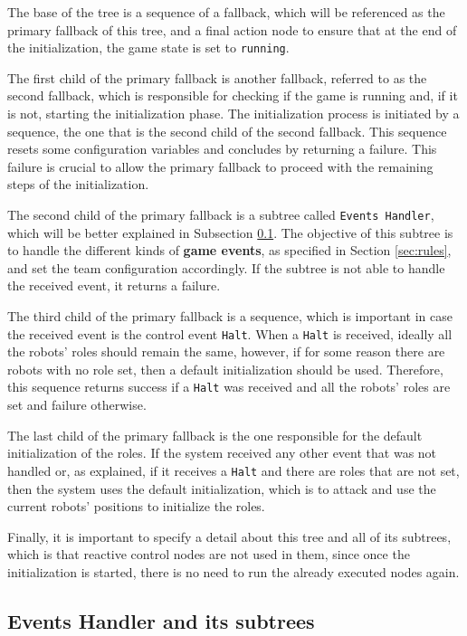 The base of the tree is a sequence of a fallback, which will be referenced as the primary fallback of this tree, and a final action node to ensure that at the end of the initialization, the game state is set to \texttt{running}. 

The first child of the primary fallback is another fallback, referred to as the second fallback, which is responsible for checking if the game is running and, if it is not, starting the initialization phase. The initialization process is initiated by a sequence, the one that is the second child of the second fallback. This sequence resets some configuration variables and concludes by returning a failure. This failure is crucial to allow the primary fallback to proceed with the remaining steps of the initialization.

The second child of the primary fallback is a subtree called \texttt{Events Handler}, which will be better explained in Subsection \ref{subsec:events_handler_spec}. The objective of this subtree is to handle the different kinds of \textbf{game events}, as specified in Section \ref{sec:rules}, and set the team configuration accordingly. If the subtree is not able to handle the received event, it returns a failure.

The third child of the primary fallback is a sequence, which is important in case the received event is the control event \texttt{Halt}. When a \texttt{Halt} is received, ideally all the robots' roles should remain the same, however, if for some reason there are robots with no role set, then a default initialization should be used. Therefore, this sequence returns success if a \texttt{Halt} was received and all the robots' roles are set and failure otherwise.

The last child of the primary fallback is the one responsible for the default initialization of the roles. If the system received any other event that was not handled or, as explained, if it receives a \texttt{Halt} and there are roles that are not set, then the system uses the default initialization, which is to attack and use the current robots' positions to initialize the roles.

Finally, it is important to specify a detail about this tree and all of its subtrees, which is that reactive control nodes are not used in them, since once the initialization is started, there is no need to run the already executed nodes again.

\subsection{Events Handler and its subtrees}
\label{subsec:events_handler_spec}

